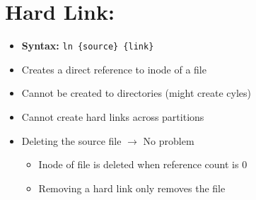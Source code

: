 \documentclass[12pt]{article}
\begin{document}
\section{Hard Link:}
\begin{itemize}
    \item \textbf{Syntax:} \texttt{ln \{source\} \{link\}}
    \item Creates a direct reference to inode of a file
    \item Cannot be created to directories (might create cyles)
    \item Cannot create hard links across partitions
    \item Deleting the source file $\to$ No problem
    \begin{itemize}
        \item Inode of file is deleted when reference count is 0
        \item Removing a hard link only removes the file
    \end{itemize}


\end{itemize}
\end{document}
